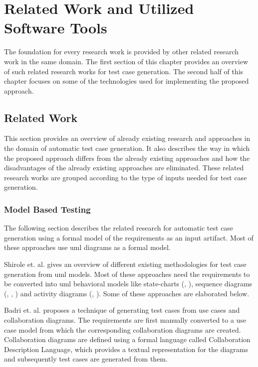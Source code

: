 
\chapter{Related Work and Utilized Software Tools}\label{relatedwork} 
The foundation for every research work is provided by other related research work in the same domain. The first section of this chapter provides an overview of such related research works for test case generation. The second half of this chapter focuses on some of the technologies used for implementing the proposed approach.

\section{Related Work}
This section provides an overview of already existing research and approaches in the domain of automatic test case generation. It also describes the way in which the proposed approach differs from the already existing approaches and how the disadvantages of the already existing approaches are eliminated. These related research works are grouped according to the type of inputs needed for test case generation. 
 
\subsection{Model Based Testing}
The following section describes the related research for automatic test case generation using a formal model of the requirements as an input artifact. Most of these approaches use \gls{uml} diagrams as a formal model.

Shirole et. al. \cite{shirole2013uml} gives an overview of different existing methodologies for test case generation from \gls{uml} models. Most of these approaches need the requirements to be converted into \gls{uml} behavioral models like state-charts (\cite{ryser1999scenario}, \cite{bandyopadhyay2009test}), sequence diagrams (\cite{nebut2003requirements}, \cite{linzhang2004generating}, \cite{briand2002uml}) and activity diagrams (\cite{nebut2006automatic}, \cite{nayak2012synthesis}).  Some of these approaches are elaborated below.

Badri et. al. \cite{badri2003use} proposes a technique of generating test cases from use cases and collaboration diagrams. The requirements are first manually converted to a use case model from which the corresponding collaboration diagrams are created. Collaboration diagrams are defined using a formal language called Collaboration Description Language, which provides a textual representation for the diagrams and subsequently test cases are generated from them.

